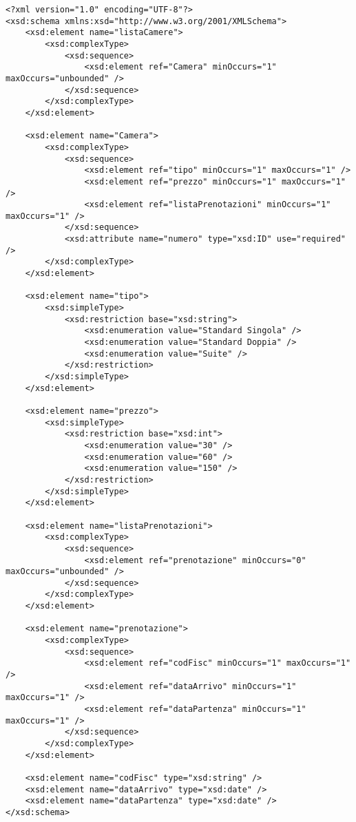 \documentclass [a4paper, 12pt]{book}
\begin{document}
\begin{lstlisting}[style=XML]
<?xml version="1.0" encoding="UTF-8"?>
<xsd:schema xmlns:xsd="http://www.w3.org/2001/XMLSchema">
    <xsd:element name="listaCamere">
        <xsd:complexType>
            <xsd:sequence>
                <xsd:element ref="Camera" minOccurs="1" maxOccurs="unbounded" />
            </xsd:sequence>
        </xsd:complexType>
    </xsd:element>

    <xsd:element name="Camera">
        <xsd:complexType>
            <xsd:sequence>
                <xsd:element ref="tipo" minOccurs="1" maxOccurs="1" />
                <xsd:element ref="prezzo" minOccurs="1" maxOccurs="1" />
                <xsd:element ref="listaPrenotazioni" minOccurs="1" maxOccurs="1" />
            </xsd:sequence>
            <xsd:attribute name="numero" type="xsd:ID" use="required" />
        </xsd:complexType>
    </xsd:element>

    <xsd:element name="tipo">
        <xsd:simpleType>
            <xsd:restriction base="xsd:string">
                <xsd:enumeration value="Standard Singola" />
                <xsd:enumeration value="Standard Doppia" />
                <xsd:enumeration value="Suite" />
            </xsd:restriction>
        </xsd:simpleType>
    </xsd:element>

    <xsd:element name="prezzo">
        <xsd:simpleType>
            <xsd:restriction base="xsd:int">
                <xsd:enumeration value="30" />
                <xsd:enumeration value="60" />
                <xsd:enumeration value="150" />
            </xsd:restriction>
        </xsd:simpleType>
    </xsd:element>

    <xsd:element name="listaPrenotazioni">
        <xsd:complexType>
            <xsd:sequence>
                <xsd:element ref="prenotazione" minOccurs="0" maxOccurs="unbounded" />
            </xsd:sequence>
        </xsd:complexType>
    </xsd:element>

    <xsd:element name="prenotazione">
        <xsd:complexType>
            <xsd:sequence>
                <xsd:element ref="codFisc" minOccurs="1" maxOccurs="1" />
                <xsd:element ref="dataArrivo" minOccurs="1" maxOccurs="1" />
                <xsd:element ref="dataPartenza" minOccurs="1" maxOccurs="1" />
            </xsd:sequence>
        </xsd:complexType>
    </xsd:element>

    <xsd:element name="codFisc" type="xsd:string" />
    <xsd:element name="dataArrivo" type="xsd:date" />
    <xsd:element name="dataPartenza" type="xsd:date" />
</xsd:schema>
\end{lstlisting}
\end{document}
